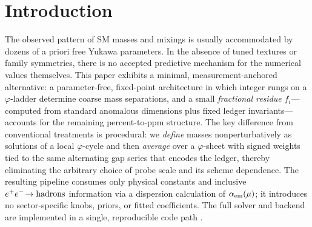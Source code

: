 \documentclass[11pt]{article}
\begin{document}
\begin{center}
\end{center}

\section{Introduction}
The observed pattern of SM masses and mixings is usually accommodated by dozens of a priori free Yukawa parameters. In the absence of tuned textures or family symmetries, there is no accepted predictive mechanism for the numerical values themselves. This paper exhibits a minimal, measurement-anchored alternative: a parameter-free, fixed-point architecture in which integer rungs on a $\varphi$-ladder determine coarse mass separations, and a small \emph{fractional residue} $f_i$---computed from standard anomalous dimensions plus fixed ledger invariants---accounts for the remaining percent-to-ppm structure. The key difference from conventional treatments is procedural: we \emph{define} masses nonperturbatively as solutions of a local $\varphi$-cycle and then \emph{average} over a $\varphi$-sheet with signed weights tied to the same alternating gap series that encodes the ledger, thereby eliminating the arbitrary choice of probe scale and its scheme dependence. The resulting pipeline consumes only physical constants and inclusive $e^+e^-\!\to{\rm hadrons}$ information via a dispersion calculation of $\alpha_{\rm em}(\mu)$; it introduces no sector-specific knobs, priors, or fitted coefficients. The full solver and backend are implemented in a single, reproducible code path \cite{EidelmanJegerlehner1995,Jegerlehner2003,Keshavarzi2019,Davier2017,PDG2024}.
\end{document}

